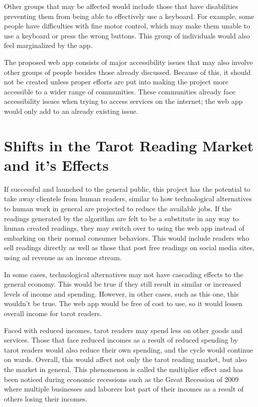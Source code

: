 \documentclass[10pt,twocolumn]{article}
\begin{document}
    Other groups that may be affected would include those that have disabilities preventing them from being able to effectively use a keyboard. For example, some people have difficulties with fine motor control\cite{ins2}, which may make them unable to use a keyboard or press the wrong buttons. This group of individuals would also feel marginalized by the app. 
    
    The proposed web app consists of major accessibility issues that may also involve other groups of people besides those already discussed. Because of this, it should not be created unless proper efforts are put into making the project more accessible to a wider range of communities. These communities already face accessibility issues when trying to access services on the internet; the web app would only add to an already existing issue.

\section{Shifts in the Tarot Reading Market and it's Effects}
    If successful and launched to the general public, this project has the potential to take away clientele from human readers, similar to how technological alternatives to human work in general are projected to reduce the available jobs\cite{strack_carrasco_kolo_nouri_priddis_george_2021}. If the readings generated by the algorithm are felt to be a substitute in any way to human created readings, they may switch over to using the web app instead of embarking on their normal consumer behaviors. This would include readers who sell readings directly as well as those that post free readings on social media sites, using ad revenue as an income stream. 
    
    In some cases, technological alternatives may not have cascading effects to the general economy. This would be true if they still result in similar or increased levels of income and spending. However, in other cases, such as this one, this wouldn't be true. The web app would be free of cost to use, so it would lessen overall income for tarot readers.
    
    Faced with reduced incomes, tarot readers may spend less on other goods and services. Those that face reduced incomes as a result of reduced spending by tarot readers would also reduce their own spending, and the cycle would continue on wards. Overall, this would affect not only the tarot reading market, but also the market in general. This phenomenon is called the multiplier effect\cite{ganti_2022} and has been noticed during economic recessions such as the Great Recession of 2009 where multiple businesses and laborers lost part of their incomes as a result of others losing their incomes\cite{temple_zito_2012}. 
    
\end{document}

